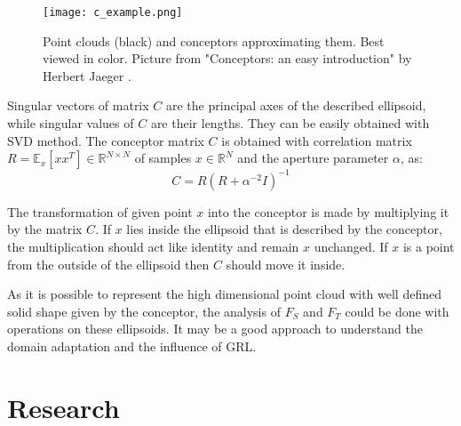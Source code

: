 \documentclass{article}
\begin{document}
\begin{figure}%
    \centering
    \texttt{[image: c\_example.png]}%
    \caption{Point clouds (black) and conceptors approximating them. Best viewed in color. Picture from "Conceptors: an easy introduction" by Herbert Jaeger \cite{conc_int}. }
    \label{fig:conceptor_intro}%
\end{figure}
Singular vectors of matrix $C$ are the principal axes of the described ellipsoid, while singular values of $C$ are their lengths. They can be easily obtained with SVD method. The conceptor matrix $C$ is obtained with correlation matrix $R = \mathbb{E}_{x}[xx^{T}] \in \mathbb{R}^{N\times N}$ of samples $x \in \mathbb{R}^{N}$ and the aperture parameter $\alpha$, as:
\begin{equation*}
    C = R(R + \alpha^{-2} I)^{-1}
\end{equation*}
\par
The transformation of given point $x$ into the conceptor is made by multiplying it by the matrix $C$. If $x$ lies inside the ellipsoid that is described by the conceptor, the multiplication should act like identity and remain $x$ unchanged. If $x$ is a point from the outside of the ellipsoid then $C$ should move it inside.
\par
As it is possible to represent the high dimensional point cloud with well defined solid shape given by the conceptor, the analysis of $F_{S}$ and $F_{T}$ could be done with operations on these ellipsoids. It may be a good approach to understand the domain adaptation and the influence of GRL.

\section{Research}
\end{document}
